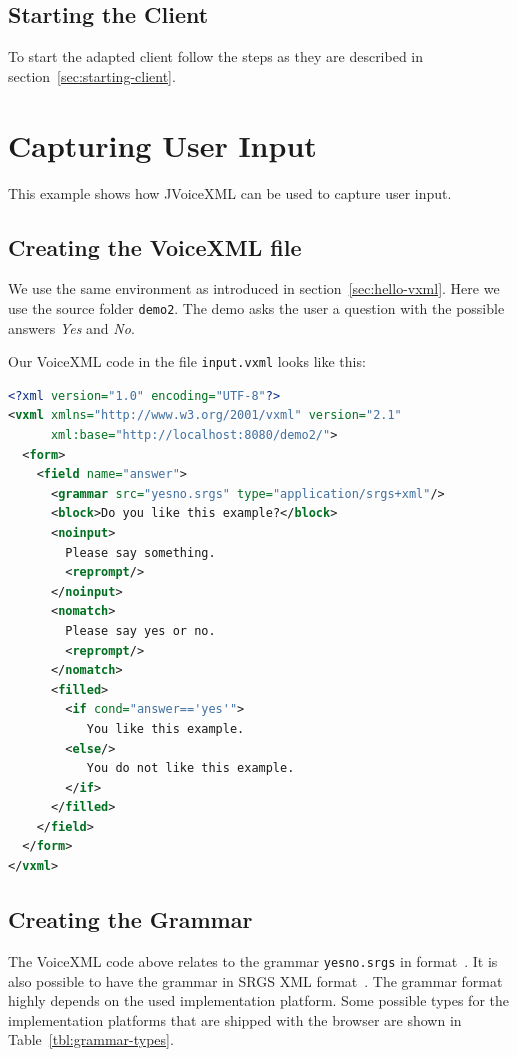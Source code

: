 \documentclass[11pt,a4paper]{book}
\begin{document}
\subsection{Starting the Client}

To start the adapted client follow the steps as they are described in
section~\ref{sec:starting-client}.

\section{Capturing User Input}

This example shows how JVoiceXML can be used to capture user input. 

\subsection{Creating the VoiceXML file}

We use the same environment as introduced in section~\ref{sec:hello-vxml}. Here
we use the source folder \texttt{demo2}.
The demo asks the user a question with the possible answers
\emph{Yes} and \emph{No}.

Our VoiceXML code in the file \texttt{input.vxml} looks like this:

\begin{lstlisting}[language=XML]
<?xml version="1.0" encoding="UTF-8"?> 
<vxml xmlns="http://www.w3.org/2001/vxml" version="2.1"
      xml:base="http://localhost:8080/demo2/">
  <form>
    <field name="answer">
      <grammar src="yesno.srgs" type="application/srgs+xml"/>
      <block>Do you like this example?</block>
      <noinput>
        Please say something.
        <reprompt/>
      </noinput>
      <nomatch>
        Please say yes or no.
        <reprompt/>
      </nomatch>
      <filled>
        <if cond="answer=='yes'">
           You like this example.
        <else/>
           You do not like this example.
        </if>
      </filled>
    </field>
  </form>
</vxml>
\end{lstlisting}

\subsection{Creating the Grammar}
\label{sec:creating-grammar}

The VoiceXML code above relates to the grammar \texttt{yesno.srgs} in 
format~\cite{w3c:srgs}.
It is also possible to have the grammar in SRGS XML format~\cite{w3c:2000:jsgf}.
The grammar format highly depends on the used implementation platform. Some
possible types for the implementation platforms that are shipped with the
browser are shown in Table~\ref{tbl:grammar-types}.
\end{document}
